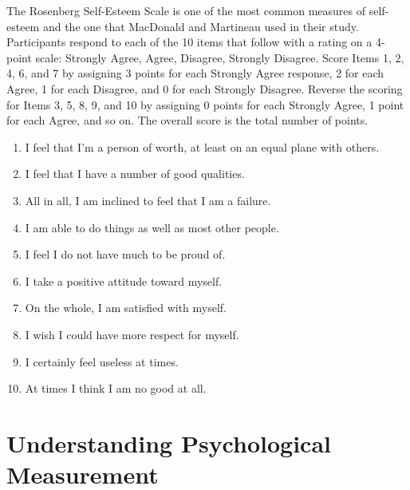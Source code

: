 \color{fgcolor}
\begin{kframe}




The Rosenberg Self-Esteem Scale \citep{rosenberg_society_1965} is one of the most common measures of self-esteem and the one that MacDonald and Martineau used in their study. Participants respond to each of the 10 items that follow with a rating on a 4-point scale: Strongly Agree, Agree, Disagree, Strongly Disagree. Score Items 1, 2, 4, 6, and 7 by assigning 3 points for each Strongly Agree response, 2 for each Agree, 1 for each Disagree, and 0 for each Strongly Disagree. Reverse the scoring for Items 3, 5, 8, 9, and 10 by assigning 0 points for each Strongly Agree, 1 point for each Agree, and so on. The overall score is the total number of points.

\begin{enumerate}
\item
I feel that I'm a person of worth, at least on an equal plane with others.

\item I feel that I have a number of good qualities.

\item All in all, I am inclined to feel that I am a failure.

\item I am able to do things as well as most other people.

\item I feel I do not have much to be proud of.

\item I take a positive attitude toward myself.

\item  On the whole, I am satisfied with myself.

\item I wish I could have more respect for myself.

\item I certainly feel useless at times.
 \item At times I think I am no good at all.
\end{enumerate}
 \end{kframe}

 \color{fgcolor}


\section{Understanding Psychological Measurement}

